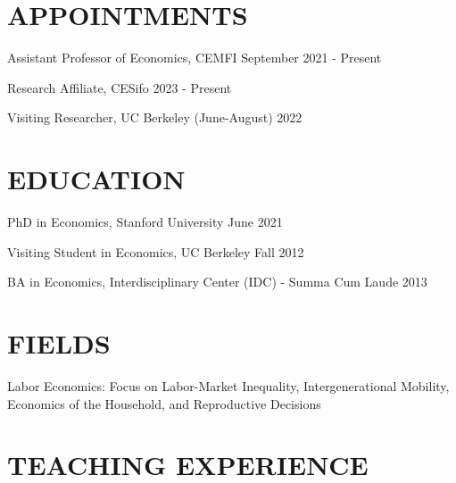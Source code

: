 \documentclass[margin]{res} %
\begin{document}
\begin{resume}


\section{APPOINTMENTS}

Assistant Professor of Economics, CEMFI \hfill September 2021 - Present

Research Affiliate, CESifo \hfill 2023 - Present

Visiting Researcher, UC Berkeley (June-August) \hfill 2022


\section{EDUCATION}

PhD in Economics, Stanford University \hfill June 2021

Visiting Student in Economics, UC Berkeley  \hfill Fall 2012 

BA in Economics, Interdisciplinary Center (IDC) - Summa Cum Laude \hfill 2013

 
\section{FIELDS}  
 Labor Economics: Focus on Labor-Market Inequality, Intergenerational Mobility, Economics of the Household, and Reproductive Decisions
 


\section{TEACHING EXPERIENCE}


\end{resume}
\end{document}
